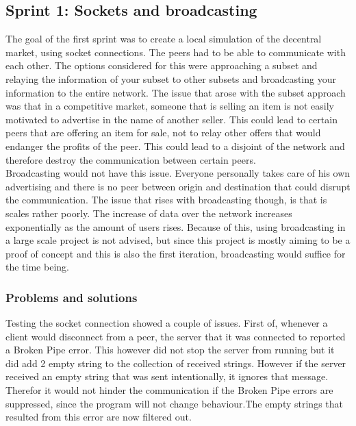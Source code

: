 \documentclass[]{article}
\begin{document}
\subsection{Sprint 1: Sockets and broadcasting}
The goal of the first sprint was to create a local simulation of the decentral market, using socket connections. The peers had to be able to communicate with each other. The options considered for this were approaching a subset and relaying the information of your subset to other subsets and broadcasting your information to the entire network. The issue that arose with the subset approach was that in a competitive market, someone that is selling an item is not easily motivated to advertise in the name of another seller. This could lead to certain peers that are offering an item for sale, not to relay other offers that would endanger the profits of the peer. This could lead to a disjoint of the network and therefore destroy the communication between certain peers. \\
Broadcasting would not have this issue. Everyone personally takes care of his own advertising and there is no peer between origin and destination that could disrupt the communication. The issue that rises with broadcasting though, is that is scales rather poorly. The increase of data over the network increases exponentially as the amount of users rises. Because of this, using broadcasting in a large scale project is not advised, but since this project is mostly aiming to be a proof of concept and this is also the first iteration, broadcasting would suffice for the time being.\\
\subsubsection{Problems and solutions}
Testing the socket connection showed a couple of issues. First of, whenever a client would disconnect from a peer, the server that it was connected to reported a Broken Pipe error. This however did not stop the server from running but it did add 2 empty string to the collection of received strings. However if the server received an empty string that was sent intentionally, it ignores that message. Therefor it would not hinder the communication if the Broken Pipe errors are suppressed, since the program will not change behaviour.The empty strings that resulted from this error are now filtered out.
\end{document}
